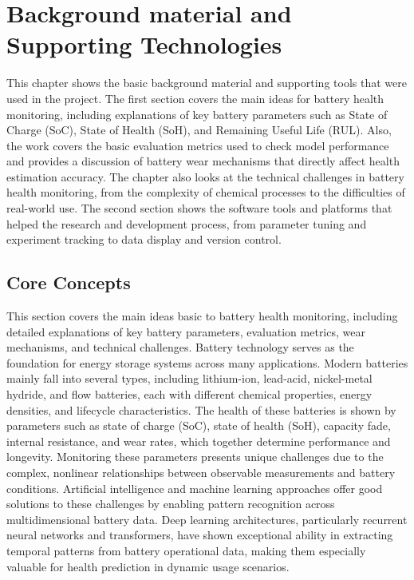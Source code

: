 \chapter{Background material and Supporting Technologies}
\label{ch:background}

This chapter shows the basic background material and supporting tools that were used in the project. The first section covers the main ideas for battery health monitoring, including explanations of key battery parameters such as State of Charge (SoC), State of Health (SoH), and Remaining Useful Life (RUL). Also, the work covers the basic evaluation metrics used to check model performance and provides a discussion of battery wear mechanisms that directly affect health estimation accuracy. The chapter also looks at the technical challenges in battery health monitoring, from the complexity of chemical processes to the difficulties of real-world use. The second section shows the software tools and platforms that helped the research and development process, from parameter tuning and experiment tracking to data display and version control.

\section{Core Concepts}

This section covers the main ideas basic to battery health monitoring, including detailed explanations of key battery parameters, evaluation metrics, wear mechanisms, and technical challenges. Battery technology serves as the foundation for energy storage systems across many applications. Modern batteries mainly fall into several types, including lithium-ion, lead-acid, nickel-metal hydride, and flow batteries, each with different chemical properties, energy densities, and lifecycle characteristics. The health of these batteries is shown by parameters such as state of charge (SoC), state of health (SoH), capacity fade, internal resistance, and wear rates, which together determine performance and longevity. Monitoring these parameters presents unique challenges due to the complex, nonlinear relationships between observable measurements and battery conditions. Artificial intelligence and machine learning approaches offer good solutions to these challenges by enabling pattern recognition across multidimensional battery data. Deep learning architectures, particularly recurrent neural networks and transformers, have shown exceptional ability in extracting temporal patterns from battery operational data, making them especially valuable for health prediction in dynamic usage scenarios. 

